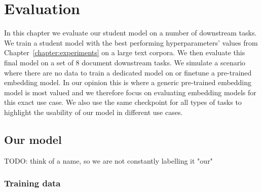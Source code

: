 \chapter{Evaluation}\label{chapter:evaluation}

In this chapter we evaluate our student model on a number of downstream tasks.
We train a student model with the best performing hyperparameters' values from
Chapter~\ref{chapter:experiments} on a large text corpora. We then evaluate this
final model on a set of 8 document downstream tasks. We simulate a scenario
where there are no data to train a dedicated model on or finetune a pre-trained
embedding model. In our opinion this is where a generic pre-trained embedding
model is most valued and we therefore focus on evaluating embedding models for
this exact use case. We also use the same checkpoint for all types of tasks to
highlight the usability of our model in different use cases.

\section{Our model}

TODO: think of a name, so we are not constantly labelling it "our"

\subsection{Training data}



